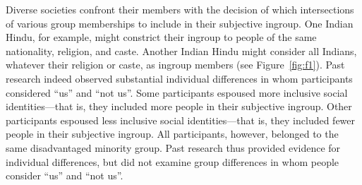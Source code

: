 \documentclass[12pt, a4paper]{article}
\begin{document}
Diverse societies confront their members with the decision of which intersections of various group memberships to include in their subjective ingroup. One Indian Hindu, for example, might constrict their ingroup to people of the same nationality, religion, and caste. Another Indian Hindu might consider all Indians, whatever their religion or caste, as ingroup members (see Figure~\ref{fig:f1}). Past research \parencite{van_dommelen_construing_2015} indeed observed substantial individual differences in whom participants considered “us” and “not us”. Some participants espoused more inclusive social identities---that is, they included more people in their subjective ingroup. Other participants espoused less inclusive social identities---that is, they included fewer people in their subjective ingroup. All participants, however, belonged to the same disadvantaged minority group. Past research thus provided evidence for individual differences, but did not examine group differences in whom people consider “us” and “not us”.

\printbibliography
\end{document}
